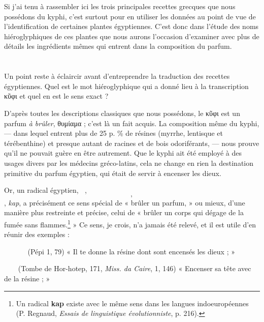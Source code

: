 \documentclass[a4paper, 11pt, oneside]{article}
\newcommand*\hieroAAAA{\raisebox{0.8ex}{}}
\newcommand*\hieroAAAB{}
\newcommand*\hieroAAAC{\raisebox{0.6ex}{}}
\newcommand*\hieroAAAD{}
\newcommand*\hieroAAAE{}
\newcommand*\hieroAAAF{}
\newcommand*\hieroAAAG{}
\newcommand*\hieroAAAH{}
\newcommand*\hieroAAAI{}
\newcommand*\hieroAAAJ{}
\newcommand*\hieroAAAK{}
\newcommand*\hieroAAAL{}
\newcommand*\hieroAAAM{}
\newcommand*\hieroAAAN{}
\newcommand*\hieroAAAO{}
\newcommand*\hieroAAAP{}
\newcommand*\hieroAAAQ{}
\newcommand*\hieroAAAR{}
\begin{document}
Si j'ai tenu à rassembler ici les trois principales recettes grecques que nous possédons du kyphi, c'est surtout pour en utiliser les données au point de vue de l'identification de certaines plantes égyptiennes. C'est donc dans l'étude des noms hiéroglyphiques de ces plantes que nous aurons l'occasion d'examiner avec plus de détails les ingrédients mêmes qui entrent dans la composition du parfum.
\clearpage
\section{}
\paragraph{}
Un point reste à éclaircir avant d'entreprendre la traduction des recettes égyptiennes. Quel est le mot hiéroglyphique qui a donné lieu à la transcription κῦφι et quel en est le sens exact ?

D'après toutes les descriptions classiques que nous possédons, le κῦφι est un parfum \emph{à brûler}, θυμίαμα ; c'est là un fait acquis. La composition même du kyphi, --- dans lequel entrent plus de 25 p. \% de résines (myrrhe, lentisque et térébenthine) et presque autant de racines et de bois odoriférants, --- nous prouve qu'il ne pouvait guère en être autrement. Que le kyphi ait été employé à des usages divers par les médecins gréco-latins, cela ne change en rien la destination primitive du parfum égyptien, qui était de servir à encenser les dieux.

Or, un radical égyptien, $\hieroAAAA\:\hieroAAAB\:\hieroAAAC$, $\hieroAAAD$, $\hieroAAAE$, \emph{kap}, a précisément ce sens spécial de « brûler un parfum, » ou mieux, d'une manière plus restreinte et précise, celui de « brûler un corps qui dégage de la fumée sans flammes.\footnote{Un radical \textbf{kap} existe avec le même sens dans les langues indoeuropéennes (P. Regnaud, \emph{Essais de linguistique évolutionniste}, p. 216).} » Ce sens, je crois, n'a jamais été relevé, et il est utile d'en réunir des exemples :

$\hieroAAAF\:\hieroAAAG\:\hieroAAAH\:\hieroAAAI\:\hieroAAAJ\:\hieroAAAA\:\hieroAAAB\:\hieroAAAK\:\hieroAAAL\:\hieroAAAI\:\hieroAAAI\:\hieroAAAI\:\hieroAAAM\:\hieroAAAN$ (Pépi 1, 79) « Il te donne la résine dont sont encensés les dieux ; »

$\hieroAAAA\:\hieroAAAB\:\hieroAAAO\:\hieroAAAP\:\hieroAAAN\:\hieroAAAH\:\hieroAAAQ\:\hieroAAAR$ (Tombe de Hor-hotep, 171, \emph{Miss. da Caire}, 1, 146) « Encenser sa tête avec de la résine ; »
\end{document}
